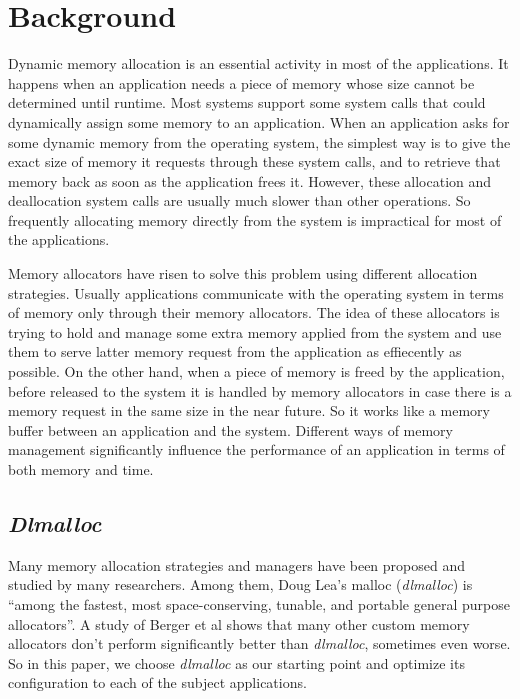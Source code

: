 \section{Background}

Dynamic memory allocation is an essential activity in most of the applications. It happens when an application needs a piece of memory whose size cannot be determined until runtime. Most systems support some system calls that could dynamically assign some memory to an application. When an application asks for some dynamic memory from the operating system, the simplest way is to give the exact size of memory it requests through these system calls, and to retrieve that memory back as soon as the application frees it. However, these allocation and deallocation system calls are usually much slower than other operations. So frequently allocating memory directly from the system is impractical for most of the applications. 

Memory allocators have risen to solve this problem using different allocation strategies. Usually applications communicate with the operating system in terms of memory only through their memory allocators. The idea of these allocators is trying to hold and manage some extra memory applied from the system and use them to serve latter memory request from the application as effiecently as possible. On the other hand, when a piece of memory is freed by the application, before released to the system it is handled by memory allocators in case there is a memory request in the same size in the near future. So it works like a memory buffer between an application and the system. Different ways of memory management significantly influence the performance of an application in terms of both memory and time.

\subsection{\emph{Dlmalloc}}

Many memory allocation strategies and managers have been proposed and studied by many researchers. Among them, Doug Lea's malloc (\emph{dlmalloc}) \cite{lea1996memory} is ``among the fastest, most space-conserving, tunable, and portable general purpose allocators''. A study of Berger et al\cite{Berger:2002:RCM:583854.582421} shows that many other custom memory allocators don't perform significantly better than \emph{dlmalloc}, sometimes even worse. So in this paper, we choose \emph{dlmalloc} as our starting point and optimize its configuration to each of the subject applications.

